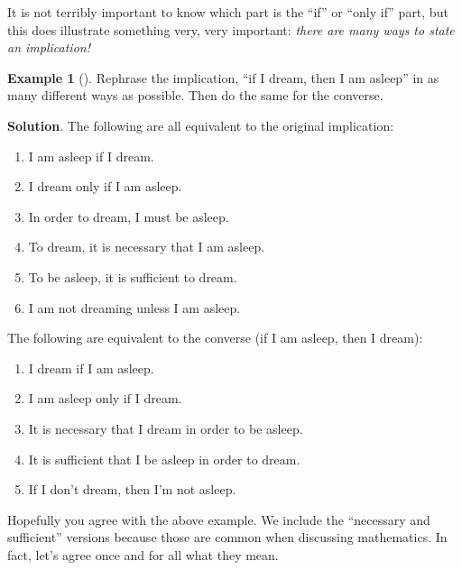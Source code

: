 \documentclass[10pt,]{book}
\theoremstyle{plain}
\theoremstyle{definition}
\theoremstyle{definition}
\newtheorem{example}[theorem]{Example}
\theoremstyle{definition}
\theoremstyle{definition}
\numberwithin{equation}{chapter}
\begin{document}
\hypertarget{p-1325}{}%
It is not terribly important to know which part is the ``if'' or ``only if'' part, but this does illustrate something very, very important: \emph{there are many ways to state an implication!}%
\begin{example}[]\label{example-37}
\hypertarget{p-1326}{}%
Rephrase the implication, ``if I dream, then I am asleep'' in as many different ways as possible. Then do the same for the converse.%
\par\smallskip%
\noindent\textbf{Solution}.\hypertarget{solution-121}{}\quad%
\hypertarget{p-1327}{}%
The following are all equivalent to the original implication: \leavevmode%
\begin{enumerate}
\item\hypertarget{li-305}{}\hypertarget{p-1328}{}%
I am asleep if I dream.%
\item\hypertarget{li-306}{}\hypertarget{p-1329}{}%
I dream only if I am asleep.%
\item\hypertarget{li-307}{}\hypertarget{p-1330}{}%
In order to dream, I must be asleep.%
\item\hypertarget{li-308}{}\hypertarget{p-1331}{}%
To dream, it is necessary that I am asleep.%
\item\hypertarget{li-309}{}\hypertarget{p-1332}{}%
To be asleep, it is sufficient to dream.%
\item\hypertarget{li-310}{}\hypertarget{p-1333}{}%
I am not dreaming unless I am asleep.%
\end{enumerate}
 The following are equivalent to the converse (if I am asleep, then I dream): \leavevmode%
\begin{enumerate}
\item\hypertarget{li-311}{}\hypertarget{p-1334}{}%
I dream if I am asleep.%
\item\hypertarget{li-312}{}\hypertarget{p-1335}{}%
I am asleep only if I dream.%
\item\hypertarget{li-313}{}\hypertarget{p-1336}{}%
It is necessary that I dream in order to be asleep.%
\item\hypertarget{li-314}{}\hypertarget{p-1337}{}%
It is sufficient that I be asleep in order to dream.%
\item\hypertarget{li-315}{}\hypertarget{p-1338}{}%
If I don't dream, then I'm not asleep.%
\end{enumerate}
%
\end{example}
\hypertarget{p-1339}{}%
Hopefully you agree with the above example. We include the ``necessary and sufficient'' versions because those are common when discussing mathematics. In fact, let's agree once and for all what they mean.%
\end{document}

